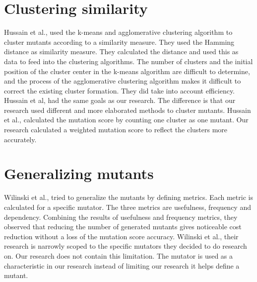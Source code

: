 \documentclass[../main]{subfiles}
\begin{document}
\section{Clustering similarity}
Hussain et al., used the k-means and agglomerative clustering algorithm to cluster mutants according to a similarity measure. 
They used the Hamming distance as similarity measure.
They calculated the distance and used this as data to feed into the clustering algorithms.
The number of clusters and the initial position of the cluster center in the k-means algorithm are difficult to determine, and the process of the agglomerative clustering algorithm makes it difficult to correct the existing cluster formation\cite{Hussain2008}.
They did take into account efficiency.
Hussain et al, had the same goals as our research. 
The difference is that our research used different and more elaborated methods to cluster mutants.
Hussain et al., calculated the mutation score by counting one cluster as one mutant.
Our research calculated a weighted mutation score to reflect the clusters more accurately.

\section{Generalizing mutants}
Wilinski et al., tried to generalize the mutants by defining metrics.
Each metric is calculated for a specific mutator.
The three metrics are usefulness, frequency and dependency.
Combining the results of usefulness and frequency metrics, they observed that reducing the number of generated mutants gives noticeable cost reduction without a loss of the mutation score accuracy.
Wilinski et al., their research is narrowly scoped to the specific mutators they decided to do research on.
Our research does not contain this limitation.
The mutator is used as a characteristic in our research instead of limiting our research it helps define a mutant.
\end{document}
